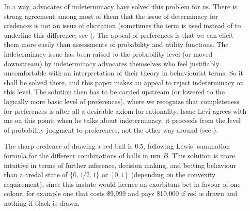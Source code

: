 \documentclass[11pt]{article}
\begin{document}
In a way, advocates of indeterminacy have solved this problem for us. There is strong agreement among most of them that the issue of determinacy for credences is not an issue of elicitation (sometimes the term  is used instead of  to underline this difference; see ). The appeal of preferences is that we can elicit them more easily than assessments of probability and utility functions. The indeterminacy issue has been raised to the probability level (or moved downstream) by indeterminacy advocates themselves who feel justifiably uncomfortable with an interpretation of their theory in behaviourist terms. So it shall be solved there, and this paper makes an appeal to reject indeterminacy on this level. The solution then has to be carried upstream (or lowered to the logically more basic level of preferences), where we recognize that completeness for preferences is after all a desirable axiom for rationality. Isaac Levi agrees with me on this point: when he talks about indeterminacy, it proceeds from the level of probability judgment to preferences, not the other way around (see ).


The sharp credence of drawing a red ball is $0.5$, following Lewis' summation formula for the different combinations of balls in urn $B$. This solution is more intuitive in terms of further inference, decision making, and betting behaviour than a credal state of $\{0,1/2,1\}$ or $[0,1]$ (depending on the convexity requirement), since this instate would licence an exorbitant bet in favour of one colour, for example one that costs \$9,999 and pays \$10,000 if red is drawn and nothing if black is drawn.

\end{document}
